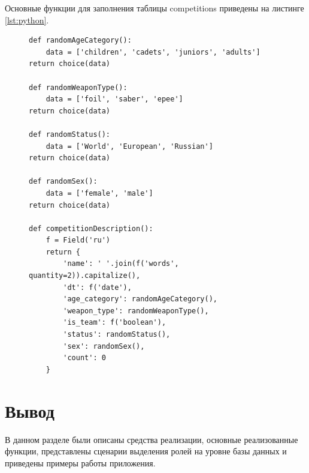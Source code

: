 Основные функции для заполнения таблицы competitions приведены на листинге \ref{lst:python}.

\begin{figure}[H]
	\begin{lstlisting}[label=lst:python,caption=функции для генерация данных для таблицы competitions]
def randomAgeCategory():
	data = ['children', 'cadets', 'juniors', 'adults']
return choice(data)

def randomWeaponType():
	data = ['foil', 'saber', 'epee']
return choice(data)

def randomStatus():
	data = ['World', 'European', 'Russian']
return choice(data)

def randomSex():
	data = ['female', 'male']
return choice(data)

def competitionDescription():
	f = Field('ru')
	return {
		'name': ' '.join(f('words', quantity=2)).capitalize(),
		'dt': f('date'),
		'age_category': randomAgeCategory(),
		'weapon_type': randomWeaponType(),
		'is_team': f('boolean'),
		'status': randomStatus(),
		'sex': randomSex(),
		'count': 0
	}
	\end{lstlisting}
\end{figure}

\section{Вывод}

В данном разделе были описаны средства реализации, основные реализованные функции, представлены сценарии выделения ролей на уровне базы данных и приведены примеры работы приложения.